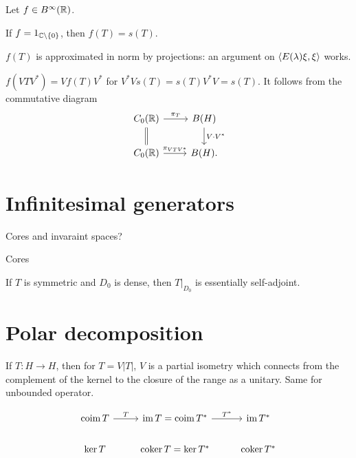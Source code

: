 \documentclass{../../large}
\begin{document}
\begin{prb}
Let $f\in B^\infty(\mathbb{R})$.
\begin{parts}
\item If $f=1_{\mathbb{C}\setminus\{0\}}$, then $f(T)=s(T)$.
\item $f(T)$ is approximated in norm by projections: an argument on $\langle E(\lambda)\xi,\xi\rangle$ works.
\item $f(VTV^*)=Vf(T)V^*$ for $V^*Vs(T)=s(T)V^*V=s(T)$. It follows from the commutative diagram
\[\begin{tikzcd}
C_0(\R)\ar[equals]{d}\ar{r}{\pi_T} & B(H) \ar{d}{V\cdot V^*}\\
C_0(\R)\ar{r}{\pi_{VTV^*}} & B(H).
\end{tikzcd}\]
\end{parts}
\end{prb}


\section{Infinitesimal generators}


\begin{prb}
\end{prb}

Cores and invaraint spaces?


\begin{prb}
Cores
\begin{parts}
\item If $T$ is symmetric and $D_0$ is dense, then $T|_{D_0}$ is essentially self-adjoint.
\end{parts}
\end{prb}

\begin{prb}
\end{prb}





\section{Polar decomposition}

If $T:H\to H$, then for $T=V|T|$, $V$ is a partial isometry which connects from the complement of the kernel to the closure of the range as a unitary.
Same for unbounded operator.


\[\begin{tikzcd}
\coim T \rar{T} & \im T=\coim T^* \rar{T^*} & \im T^* \\
\ker T & \coker T=\ker T^* & \coker T^*
\end{tikzcd}\]
\end{document}
